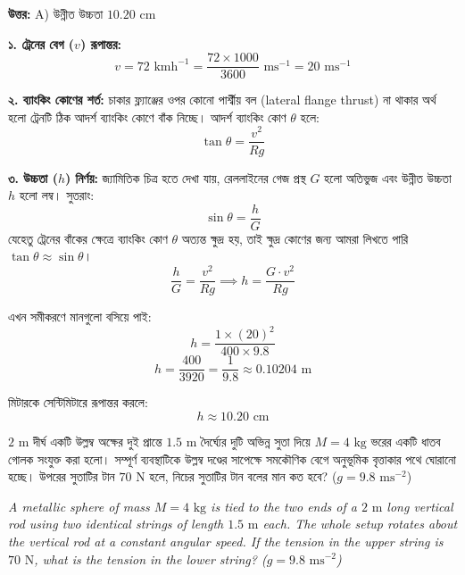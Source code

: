 \documentclass[12pt, a4paper]{article}
\begin{document}
{\vspace{0.5em}
\begin{tcolorbox}[answerbox]
\textbf{\color{success} উত্তর:} A) উন্নীত উচ্চতা $10.20\text{ cm}$
\end{tcolorbox}
\vspace{1em}

\begin{tcolorbox}[solutionbox={সমাধান (Solution)}]
\noindent
\textbf{১. ট্রেনের বেগ ($v$) রূপান্তর:}
$$v = 72\text{ kmh}^{-1} = \frac{72 \times 1000}{3600}\text{ ms}^{-1} = 20\text{ ms}^{-1}$$

\vspace{0.5em}
\textbf{২. ব্যাংকিং কোণের শর্ত:}
চাকার ফ্ল্যাঞ্জের ওপর কোনো পার্শ্বীয় বল (lateral flange thrust) না থাকার অর্থ হলো ট্রেনটি ঠিক আদর্শ ব্যাংকিং কোণে বাঁক নিচ্ছে। আদর্শ ব্যাংকিং কোণ $\theta$ হলে:
$$\tan\theta = \frac{v^2}{Rg}$$

\vspace{0.5em}
\textbf{৩. উচ্চতা ($h$) নির্ণয়:}
জ্যামিতিক চিত্র হতে দেখা যায়, রেললাইনের গেজ প্রস্থ $G$ হলো অতিভুজ এবং উন্নীত উচ্চতা $h$ হলো লম্ব। সুতরাং:
$$\sin\theta = \frac{h}{G}$$
যেহেতু ট্রেনের বাঁকের ক্ষেত্রে ব্যাংকিং কোণ $\theta$ অত্যন্ত ক্ষুদ্র হয়, তাই ক্ষুদ্র কোণের জন্য আমরা লিখতে পারি $\tan\theta \approx \sin\theta$।
$$\frac{h}{G} = \frac{v^2}{Rg} \implies h = \frac{G \cdot v^2}{Rg}$$

এখন সমীকরণে মানগুলো বসিয়ে পাই:
$$h = \frac{1 \times (20)^2}{400 \times 9.8}$$
$$h = \frac{400}{3920} = \frac{1}{9.8} \approx 0.10204\text{ m}$$

মিটারকে সেন্টিমিটারে রূপান্তর করলে:
$$h \approx 10.20\text{ cm}$$
\end{tcolorbox}
\vspace{1em}
\begin{tcolorbox}[questionbox={প্রশ্ন (Question) 24}]
\noindent
$2\text{ m}$ দীর্ঘ একটি উল্লম্ব অক্ষের দুই প্রান্তে $1.5\text{ m}$ দৈর্ঘ্যের দুটি অভিন্ন সুতা দিয়ে $M = 4\text{ kg}$ ভরের একটি ধাতব গোলক সংযুক্ত করা হলো। সম্পূর্ণ ব্যবস্থাটিকে উল্লম্ব দণ্ডের সাপেক্ষে সমকৌণিক বেগে অনুভূমিক বৃত্তাকার পথে ঘোরানো হচ্ছে। উপরের সুতাটির টান $70\text{ N}$ হলে, নিচের সুতাটির টান বলের মান কত হবে? ($g = 9.8\text{ ms}^{-2}$)

\vspace{0.8em}
\begin{english}
\noindent\textit{\color{darkgray}
A metallic sphere of mass $M = 4\text{ kg}$ is tied to the two ends of a $2\text{ m}$ long vertical rod using two identical strings of length $1.5\text{ m}$ each. The whole setup rotates about the vertical rod at a constant angular speed. If the tension in the upper string is $70\text{ N}$, what is the tension in the lower string? ($g = 9.8\text{ ms}^{-2}$)
}
\end{english}
\end{tcolorbox}

}
\end{document}
